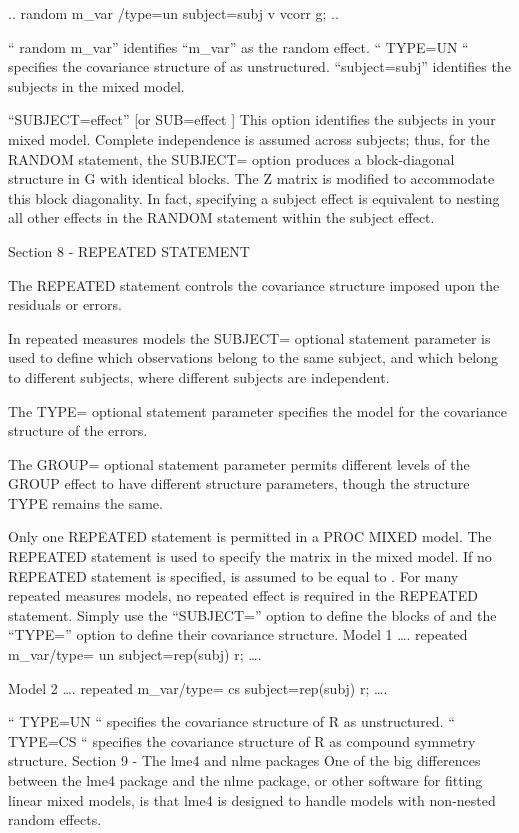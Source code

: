 ..
random m_var /type=un subject=subj v vcorr g;
..

“ random m_var” identifies “m_var” as the random effect.
“ TYPE=UN “ specifies the covariance structure of   as unstructured.
“subject=subj” identifies the subjects in the mixed model.

“SUBJECT=effect” 		[or SUB=effect ]
This option identifies the subjects in your mixed model. Complete independence is assumed across subjects; thus, for the RANDOM statement, the SUBJECT= option produces a block-diagonal structure in G with identical blocks. 
The Z matrix is modified to accommodate this block diagonality. 
In fact, specifying a subject effect is equivalent to nesting all other effects in the RANDOM statement within the subject effect. 







Section 8 - REPEATED STATEMENT

The REPEATED statement controls the covariance structure imposed upon the residuals or errors.

In repeated measures models the SUBJECT= optional statement parameter is used to define which observations belong to the same subject, and which belong to different subjects, where different subjects are independent. 

The TYPE= optional statement parameter specifies the model for the covariance structure of the errors. 

The GROUP= optional statement parameter permits different levels of the GROUP effect to have different structure parameters, though the structure TYPE remains the same. 

Only one REPEATED statement is permitted in a PROC MIXED model.
The REPEATED statement is used to specify the   matrix in the mixed model. 
If no REPEATED statement is specified,  is assumed to be equal to  .
For many repeated measures models, no repeated effect is required in the REPEATED statement. Simply use the “SUBJECT=” option to define the blocks of   and the “TYPE=” option to define their covariance structure.
Model 1
….
repeated m_var/type= un subject=rep(subj) r;
….

Model 2
….
repeated m_var/type= cs subject=rep(subj) r;
….

“ TYPE=UN “ specifies the covariance structure of R as unstructured.
“ TYPE=CS “ specifies the covariance structure of R as compound symmetry structure.
Section 9 - The lme4 and nlme packages
One of the big differences between the lme4 package and the nlme package, or other software for fitting linear mixed models, is that lme4 is designed to handle models with non-nested random effects.

